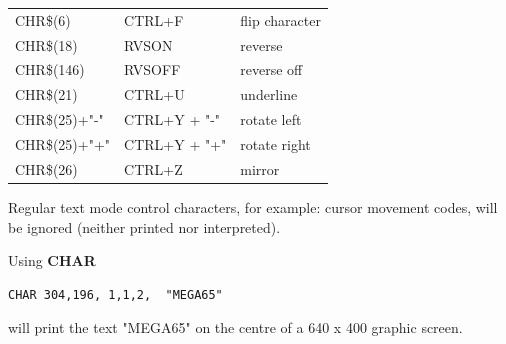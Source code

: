 \begin{description}[leftmargin=2cm,style=nextline]
                {\setlength{\tabcolsep}{1mm}

                \ttfamily
                \begin{tabular}{|l|l|l|}
                  \hline
                     CHR\$(6)       &  CTRL+F         &  flip character \\
                     CHR\$(18)      &  RVSON          &  reverse  \\
                     CHR\$(146)     &  RVSOFF         &  reverse off \\
                     CHR\$(21)      &  CTRL+U         &  underline\\
                     CHR\$(25)+"-"  &  CTRL+Y + "-"   &  rotate left\\
                     CHR\$(25)+"+"  &  CTRL+Y + "+"   &  rotate right\\
                     CHR\$(26)      &  CTRL+Z         &  mirror\\
                  \hline
                  \end{tabular}
                }

\item [Remarks:]
                Regular text mode control characters,
                for example: cursor movement codes, will be ignored
                (neither printed nor interpreted).


\item [Example:] Using {\bf CHAR}
\begin{tcolorbox}[colback=black,coltext=white]
\verbatimfont{\codefont}
\begin{verbatim}
CHAR 304,196, 1,1,2,  "MEGA65"
\end{verbatim}
\end{tcolorbox}
will print the text "MEGA65" on the centre of a 640 x 400 graphic screen.
\end{description}


\newpage

